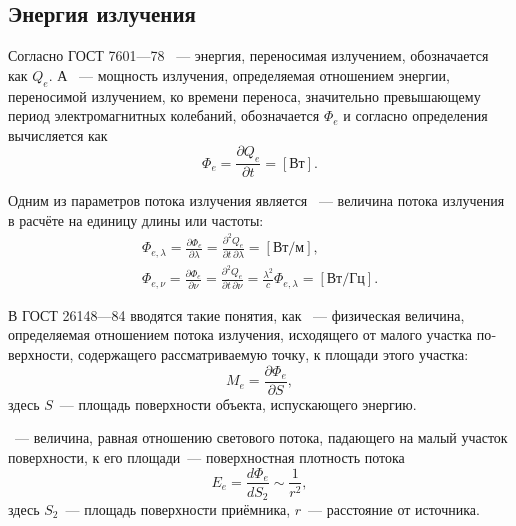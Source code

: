 \subsection{Энергия излучения}
Согласно ГОСТ 7601---78 ~--- энергия, переносимая излучением, обозначается как $Q_e$. А ~--- мощность излучения, определяемая отношением энергии, переносимой излучением, ко времени переноса,  значительно превышающему период электромагнитных колебаний, обозначается $\Phi_e$ и согласно определения вычисляется как
\begin{equation}
	\Phi_e = \frac{\partial Q_e}{\partial t} = [\text{Вт}].
\end{equation}

Одним из параметров потока излучения является ~--- величина потока излучения в расчёте на единицу длины или частоты:
\begin{gather*}
    \Phi_{e, \lambda}
    = \frac{\partial \Phi_e}{\partial \lambda} 
    = \frac{\partial^2 Q_e}{\partial t \, \partial \lambda}
    = [\text{Вт/м}],\\
    \Phi_{e, \nu} 
    = \frac{\partial \Phi_e}{\partial \nu} 
    = \frac{\partial^2 Q_e}{\partial t \, \partial \nu}
    = \frac{\lambda^2}{c}\Phi_{e, \lambda}
    = [\text{Вт/Гц}].
\end{gather*}


В ГОСТ 26148---84 вводятся такие понятия, как ~--- физическая величина, определяемая отношением потока излучения, исходящего от малого участка по­верхности, содержащего рассматри­ваемую точку, к площади этого участка:
\begin{equation}
	M_e = \frac{\partial \Phi_e}{\partial S},
\end{equation}
здесь $S$~--- площадь поверхности объекта, испускающего энергию.

~--- величина, равная отношению светового потока, падающего на малый участок поверхности, к его площади~--- поверхностная плотность потока
\begin{equation}
	E_e = \frac{d\Phi_e}{dS_2} \sim \frac{1}{r^2},
\end{equation}
здесь $S_2$~--- площадь поверхности приёмника, $r$~--- расстояние от источника.

